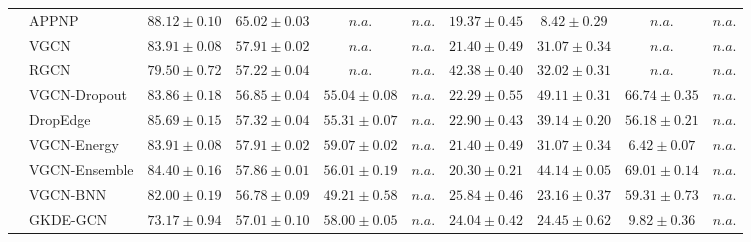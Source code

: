 \begin{table*}[!h]
{\begin{tabular}{ll|cccc|cccc}
        & APPNP & ${\mathbf{88.12}\scriptscriptstyle \pm 0.10}$ & ${{65.02}\scriptscriptstyle \pm 0.03}$ & $n.a.$ & $n.a.$ & ${19.37\scriptscriptstyle \pm 0.45}$ & ${8.42\scriptscriptstyle \pm 0.29}$ & $n.a.$ & $n.a.$\\
        & VGCN & ${83.91\scriptscriptstyle \pm 0.08}$ & ${57.91\scriptscriptstyle \pm 0.02}$ & $n.a.$ & $n.a.$ & ${21.40\scriptscriptstyle \pm 0.49}$ & ${31.07\scriptscriptstyle \pm 0.34}$ & $n.a.$ & $n.a.$\\
        & RGCN & ${79.50\scriptscriptstyle \pm 0.72}$ & ${57.22\scriptscriptstyle \pm 0.04}$ & $n.a.$ & $n.a.$ & ${42.38\scriptscriptstyle \pm 0.40}$ & ${32.02\scriptscriptstyle \pm 0.31}$ & $n.a.$ & $n.a.$\\
        & VGCN-Dropout & ${83.86\scriptscriptstyle \pm 0.18}$ & ${56.85\scriptscriptstyle \pm 0.04}$ & ${55.04\scriptscriptstyle \pm 0.08}$ & $n.a.$ & ${22.29\scriptscriptstyle \pm 0.55}$ & ${49.11\scriptscriptstyle \pm 0.31}$ & ${66.74\scriptscriptstyle \pm 0.35}$ & $n.a.$\\
        & DropEdge & ${85.69\scriptscriptstyle \pm 0.15}$ & ${57.32\scriptscriptstyle \pm 0.04}$ & ${55.31\scriptscriptstyle \pm 0.07}$ & $n.a.$ & ${22.90\scriptscriptstyle \pm 0.43}$ & ${39.14\scriptscriptstyle \pm 0.20}$ & ${56.18\scriptscriptstyle \pm 0.21}$ & $n.a.$\\
        & VGCN-Energy & ${83.91\scriptscriptstyle \pm 0.08}$ & ${57.91\scriptscriptstyle \pm 0.02}$ & ${59.07\scriptscriptstyle \pm 0.02}$ & $n.a.$ & ${21.40\scriptscriptstyle \pm 0.49}$ & ${31.07\scriptscriptstyle \pm 0.34}$ & ${6.42\scriptscriptstyle \pm 0.07}$ & $n.a.$\\
        & VGCN-Ensemble & ${84.40\scriptscriptstyle \pm 0.16}$ & ${57.86\scriptscriptstyle \pm 0.01}$ & ${56.01\scriptscriptstyle \pm 0.19}$ & $n.a.$ & ${20.30\scriptscriptstyle \pm 0.21}$ & ${44.14\scriptscriptstyle \pm 0.05}$ & ${69.01\scriptscriptstyle \pm 0.14}$ & $n.a.$\\
        & VGCN-BNN & ${82.00\scriptscriptstyle \pm 0.19}$ & ${56.78\scriptscriptstyle \pm 0.09}$ & ${49.21\scriptscriptstyle \pm 0.58}$ & $n.a.$ & ${25.84\scriptscriptstyle \pm 0.46}$ & ${23.16\scriptscriptstyle \pm 0.37}$ & ${59.31\scriptscriptstyle \pm 0.73}$ & $n.a.$\\
        & GKDE-GCN & ${73.17\scriptscriptstyle \pm 0.94}$ & ${57.01\scriptscriptstyle \pm 0.10}$ & ${58.00\scriptscriptstyle \pm 0.05}$ & $n.a.$ & ${24.04\scriptscriptstyle \pm 0.42}$ & ${24.45\scriptscriptstyle \pm 0.62}$ & ${9.82\scriptscriptstyle \pm 0.36}$ & $n.a.$\\

\end{tabular}}
\end{table*}
